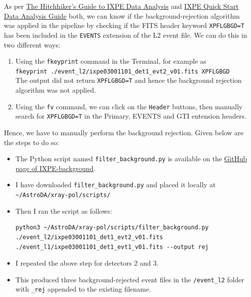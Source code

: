 		As per \href{https://arxiv.org/pdf/2604.03366}{The Hitchhiker's Guide to IXPE Data Analysis} and \href{https://heasarc.gsfc.nasa.gov/docs/ixpe/analysis/ixpe_quickstart.pdf}{IXPE Quick Start Data Analysis Guide} both, we can know if the background-rejection algorithm was applied in the pipeline by checking if the FITS header keyword \verb|XPFLGBGD=T| has been included in the \verb|EVENTS| extension of the L2 event file. We can do this in two different ways:
		\begin{enumerate}
			\item Using the \verb|fkeyprint| command in the Terminal, for example as\\
			\verb|fkeyprint ./event_l2/ixpe03001101_det1_evt2_v01.fits XPFLGBGD|\\
			The output did not return \verb|XPFLGBGD=T| and hence the background rejection algorithm was not applied.
			
			\item Using the \verb|fv| command, we can click on the \verb|Header| buttons, then manually search for \verb|XPFLGBGD=T| in the Primary, EVENTS and GTI entension headers.
		\end{enumerate}
		Hence, we have to manually perform the background rejection. Given below are the steps to do so:
		\begin{itemize}
			\item The Python script named \verb|filter_background.py| is available on the \href{https://github.com/aledimarco/IXPE-background}{GitHub page of IXPE-background}.
			
			\item I have downloaded \verb|filter_background.py| and placed it locally at\\ 
			\verb|~/AstroDA/xray-pol/scripts/|
			
			\item Then I ran the script as follows:
			\begin{verbatim}
python3 ~/AstroDA/xray-pol/scripts/filter_background.py
./event_l2/ixpe03001101_det1_evt2_v01.fits
./event_l1/ixpe03001101_det1_evt1_v01.fits --output rej
			\end{verbatim}
			
			\item I repeated the above step for detectors 2 and 3.
			
			\item This produced three background-rejected event files in the \verb|/event_l2| folder with \verb|_rej| appended to the existing filename.
		\end{itemize}
		
